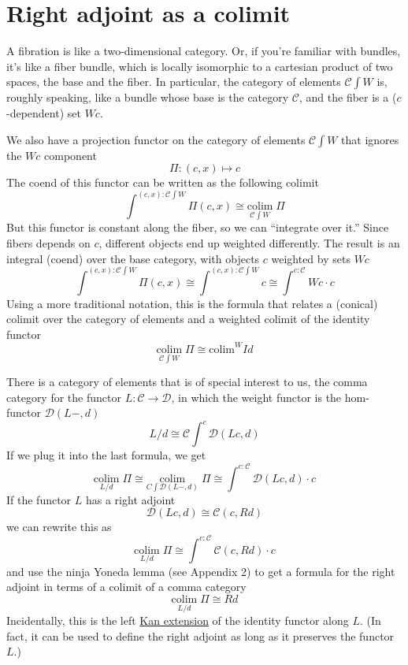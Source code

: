 \documentclass[11pt]{amsart}
\begin{document}
\section{Right adjoint as a colimit}

A fibration is like a two-dimensional category. Or, if you're familiar with bundles, it's like a fiber bundle, which is locally isomorphic to a cartesian product of two spaces, the base and the fiber. In particular, the category of elements $\mathcal{C} \int W$ is, roughly speaking, like a bundle whose base is the category $\mathcal{C}$, and the fiber is a ($c$-dependent) set $W c$. 

We also have a projection functor on the category of elements $\mathcal{C} \int W$ that ignores the $W c$ component
\[\Pi \colon (c, x) \mapsto c\] 
The coend of this functor can be written as the following colimit
\[\int^{(c, x) \colon \mathcal{C}\int W} \Pi (c, x) \cong \underset{\mathcal{C} \int W}{\mbox{colim}} \; \Pi  \]
But this functor is constant along the fiber, so we can ``integrate over it.'' Since fibers depends on $c$, different objects end up weighted differently. The result is an integral (coend) over the base category, with objects $c$ weighted by sets $W c$
\[\int^{(c, x) \colon \mathcal{C}\int W} \Pi (c, x) \cong \int^{(c, x) \colon \mathcal{C}\int W} c  \cong   \int^{c \colon \mathcal{C}} W c \cdot c\]
Using a more traditional notation, this is the formula that relates a (conical) colimit over the category of elements and a weighted colimit of the identity functor
\[\underset{\mathcal{C} \int W}{\mbox{colim}} \;  \Pi  \cong \mbox{colim}^W Id\]

There is a category of elements that is of special interest to us, the comma category for the functor $L \colon \mathcal{C} \to \mathcal{D}$, in which the weight functor is the hom-functor $\mathcal{D}(L-, d)$
\[L/d \cong \mathcal{C}\int^{c} \mathcal{D}(L c, d)\]
If we plug it into the last formula, we get
\[\underset{L/d}{\mbox{colim}} \;  \Pi  \cong \underset{C \int \mathcal{D}(L-, d)}{\mbox{colim}} \;  \Pi  \cong \int^{c \colon \mathcal{C}} \mathcal{D}(L c, d) \cdot c\]
If the functor $L$ has a right adjoint
\[\mathcal{D}(L c, d) \cong \mathcal{C}(c, R d)\]
we can rewrite this as
\[\underset{L/d}{\mbox{colim}} \;  \Pi  \cong \int^{c \colon \mathcal{C}} \mathcal{C}(c, R d) \cdot c\]
and use the ninja Yoneda lemma (see Appendix 2) to get a formula for the right adjoint in terms of a colimit of a comma category
\[\underset{L/d}{\mbox{colim}} \; \Pi  \cong R d\]
Incidentally, this is the left \href{https://bartoszmilewski.com/2017/04/17/kan-extensions/}{Kan extension} of the identity functor along $L$. (In fact, it can be used to define the right adjoint as long as it preserves the functor $L$.)
\end{document}
